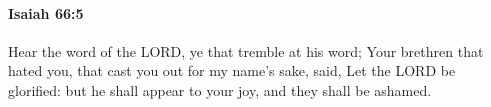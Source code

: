 
		\paragraph{Isaiah 66:5} %
			\label{ISAIAH-66-5}

			Hear the word of the LORD, ye that tremble at his word; Your brethren that hated you, that cast you out for my name's sake, said, Let the LORD be glorified: but he shall appear to your joy, and they shall be ashamed.



